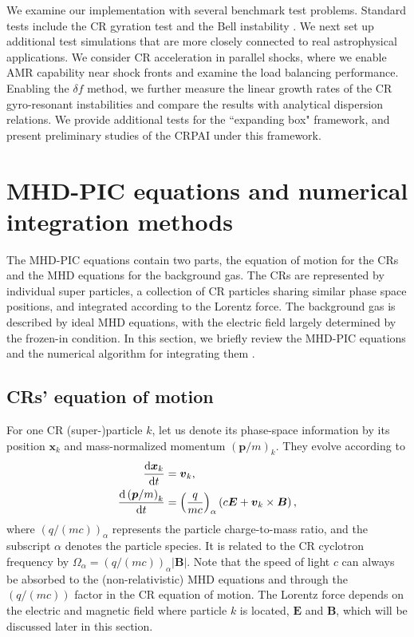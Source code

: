 \documentclass[fleqn,usenatbib]{mnras}
\begin{document}
We examine our implementation with several benchmark test problems. Standard tests include the CR gyration test and the Bell instability \citep{2004MNRAS.353..550B}.
We next set up additional test simulations that are more closely connected to real astrophysical applications.
We consider CR acceleration in parallel shocks,
where we enable AMR capability near shock fronts and examine the load balancing performance.
Enabling the $\delta f$ method, we further measure the linear growth rates of the CR gyro-resonant instabilities and compare the results with analytical dispersion relations. We provide additional tests for the ``expanding box" framework, and present preliminary studies of the CRPAI under this framework.


\section{MHD-PIC equations and numerical integration methods}
\label{sec::mhd_pic}

The MHD-PIC equations contain two parts, the equation of motion for the CRs and the MHD equations for the background gas. The CRs are represented by individual super particles, a collection of CR particles sharing similar phase space positions, and integrated according to the Lorentz force. The background gas is described by ideal MHD equations, with the electric field largely determined by the frozen-in condition. In this section, we briefly review the MHD-PIC equations and the numerical algorithm for integrating them \citep[see details in][]{2015ApJ...809...55B, 2018MNRAS.473.3394V, 2018ApJ...859...13M}.

\subsection{CRs' equation of motion}
\label{sec::pic_integrate}

For one CR (super-)particle $k$, let us denote its phase-space information by its position $\boldsymbol{x}_k$ and mass-normalized momentum $\left(\boldsymbol{p} / m\right)_k$. They evolve according to
\begin{align}
	\frac{\dd \boldsymbol{x}_k}{\dd t} &= \boldsymbol{v}_k, \notag \\ 
	\frac{\dd \left(\boldsymbol{p} / m\right)_k}{\dd t} &= \left(\frac{q}{mc}\right)_\alpha \left(c \boldsymbol{E} + \boldsymbol{v}_k \times \boldsymbol{B} \right), \label{equ::pic_dynamic}
\end{align}
where $\left(q /\left(mc\right)\right)_\alpha$ represents the particle charge-to-mass ratio, and the subscript $\alpha$ denotes the particle species. It is related to the CR cyclotron frequency by $\Omega_{\alpha} = \left(q /\left(mc\right)\right)_\alpha |\boldsymbol{B}|$. Note that the speed of light $c$ can always be absorbed to the (non-relativistic) MHD equations and through the $\left(q /\left(mc\right)\right)$ factor in the CR equation of motion. The Lorentz force depends on the electric and magnetic field where particle $k$ is located, $\boldsymbol{E}$ and $\boldsymbol{B}$, which will be discussed later in this section.
\end{document}
